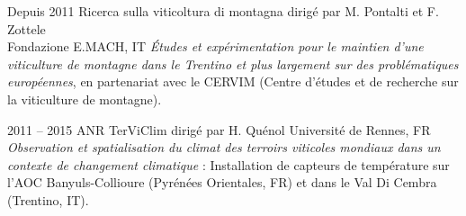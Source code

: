 \documentclass[]{cv-etienne}
\begin{document}
\begin{entrylist}
\entry
{Depuis 2011}
{Ricerca sulla viticoltura di montagna  {\normalfont  dirigé par M. Pontalti et F. Zottele \\}}
{ Fondazione E.MACH, IT}
{\emph{Études et expérimentation pour le maintien d'une viticulture de montagne dans le Trentino et plus largement sur des problématiques européennes}, en partenariat avec le CERVIM  (Centre d'études et de recherche sur la viticulture de montagne).}
\end{entrylist}
\begin{entrylist}
\entry
{2011 -- 2015}
{ANR TerViClim {\normalfont dirigé par H. Quénol}}
{ Université de Rennes, FR}
{\emph{Observation et spatialisation du climat des terroirs viticoles mondiaux dans un contexte de changement climatique} :
Installation de capteurs de température sur l'AOC Banyuls-Collioure (Pyrénées Orientales, FR) et dans le Val Di Cembra (Trentino, IT).}
\end{entrylist}
\end{document}
